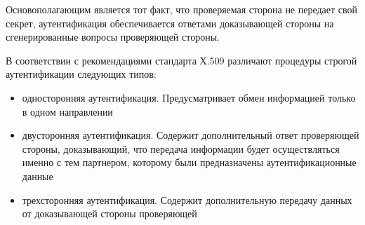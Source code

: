 Основополагающим является тот факт, что проверяемая сторона не передает свой секрет, аутентификация
обеспечивается ответами доказывающей стороны на сгенерированные вопросы проверяющей стороны.

В соответствии с рекомендациями стандарта Х.509 различают процедуры строгой аутентификации
следующих типов:
\begin{itemize}
    \item односторонняя аутентификация. Предусматривает обмен информацией только в одном направлении
    \item двусторонняя аутентификация. Содержит дополнительный ответ проверяющей стороны,
        доказывающий, что передача информации будет осуществляться именно с тем партнером, которому
        были предназначены аутентификационные данные
    \item трехсторонняя аутентификация. Содержит дополнительную передачу данных от доказывающей
        стороны проверяющей
\end{itemize}

